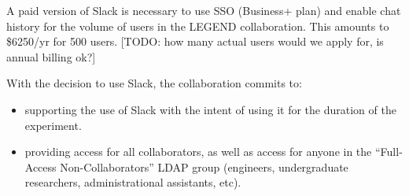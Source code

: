 \documentclass[11pt,letterpaper]{article}
\begin{document}
A paid version of Slack is necessary to use SSO (Business+ plan) and enable chat history for the volume of users in the LEGEND collaboration. This amounts to \$6250/yr for 500 users. [TODO: how many actual users would we apply for, is annual billing ok?]

With the decision to use Slack, the collaboration commits to:
\begin{itemize}
    \item supporting the use of Slack with the intent of using it for the duration of the experiment.
    \item providing access for all collaborators, as well as access for anyone in the ``Full-Access Non-Collaborators'' LDAP group (engineers, undergraduate researchers,  administrational assistants, etc).
\end{itemize}
\end{document}
